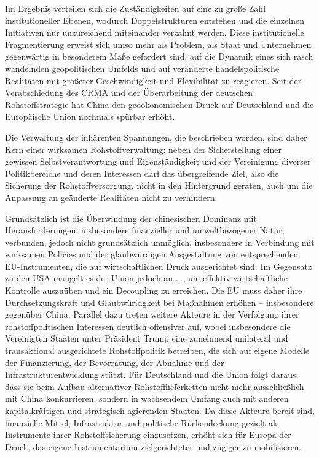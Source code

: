 \documentclass[12pt,a4paper,oneside]{book} %
\begin{document}
{Im Ergebnis verteilen sich die Zuständigkeiten auf eine zu große Zahl institutioneller Ebenen, wodurch Doppelstrukturen entstehen und die einzelnen Initiativen nur unzureichend miteinander verzahnt werden. Diese institutionelle Fragmentierung erweist sich umso mehr als Problem, als Staat und Unternehmen gegenwärtig in besonderem Maße gefordert sind, auf die Dynamik eines sich rasch wandelnden geopolitischen Umfelds und auf veränderte handelspolitische Realitäten mit größerer Geschwindigkeit und Flexibilität zu reagieren. Seit der Verabschiedung des CRMA und der Überarbeitung der deutschen Rohstoffstrategie hat China den geoökonomischen Druck auf Deutschland und die Europäische Union nochmals spürbar erhöht.


Die Verwaltung der inhärenten Spannungen, die beschrieben worden, sind daher Kern einer wirksamen Rohstoffverwaltung: neben der Sicherstellung einer gewissen Selbstverantwortung und Eigenständigkeit und der Vereinigung diverser Politikbereiche und deren Interessen darf das übergreifende Ziel, also die Sicherung der Rohstoffversorgung, nicht in den Hintergrund geraten, auch um die Anpassung an geänderte Realitäten nicht zu verhindern.

Grundsätzlich ist die Überwindung der chinesischen Dominanz mit Herausforderungen, insbesondere finanzieller und umweltbezogener Natur, verbunden, jedoch nicht grundsätzlich unmöglich, insbesondere in Verbindung mit wirksamen Policies und der glaubwürdigen Ausgestaltung von entsprechenden EU-Instrumenten, die auf wirtschaftlichen Druck ausgerichtet sind. Im Gegensatz zu den USA mangelt es der Union jedoch an ..., um effektiv wirtschaftliche Kontrolle auszuüben und ein Decoupling zu erreichen. Die EU muss daher ihre Durchsetzungskraft und Glaubwüridgkeit bei Maßnahmen erhöhen -- insbesondere gegenüber China. Parallel dazu treten weitere Akteure in der Verfolgung ihrer rohstoffpolitischen Interessen deutlich offensiver auf, wobei insbesondere die Vereinigten Staaten unter Präsident Trump eine zunehmend unilateral und transaktional ausgerichtete Rohstoffpolitik betreiben, die sich auf eigene Modelle der Finanzierung, der Bevorratung, der Abnahme und der Infrastrukturentwicklung stützt. Für Deutschland und die Union folgt daraus, dass sie beim Aufbau alternativer Rohstofflieferketten nicht mehr ausschließlich mit China konkurrieren, sondern in wachsendem Umfang auch mit anderen kapitalkräftigen und strategisch agierenden Staaten. Da diese Akteure bereit sind, finanzielle Mittel, Infrastruktur und politische Rückendeckung gezielt als Instrumente ihrer Rohstoffsicherung einzusetzen, erhöht sich für Europa der Druck, das eigene Instrumentarium zielgerichteter und zügiger zu mobilisieren.

}
\end{document}
